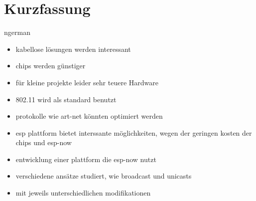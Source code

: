 \documentclass[]{ccs-thesis}
\begin{document}
\chapter*{Kurzfassung}
\begin{otherlanguage*}{ngerman}
\begin{itemize}
	\item kabellose lösungen werden interessant
	\item chips werden günstiger
	\item für kleine projekte leider sehr teuere Hardware
	\item 802.11 wird als standard benutzt
	\item protokolle wie art-net könnten optimiert werden
	\item esp plattform bietet interssante möglichkeiten, wegen der geringen kosten der chips und esp-now
	\item entwicklung einer plattform die esp-now nutzt
	\item verschiedene ansätze studiert, wie broadcast und unicasts
	\item mit jeweils unterschiedlichen modifikationen
\end{itemize}


\end{otherlanguage*}
\acresetall

\cleardoublepage
\tableofcontents
{}

\cleardoublepage
{}












% 

\cleardoublepage

\listofabbreviations
\clearpage

\listoffigures
\clearpage

\listoftables
\clearpage

\lstlistoflistings
\clearpage



\printbibliography
\end{document}
